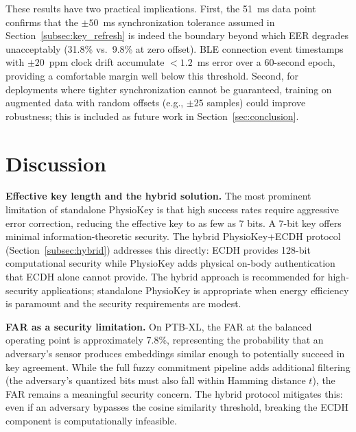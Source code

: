 \documentclass[sensors,article,submit,pdftex,moreauthors]{Definitions/mdpi}
\begin{document}
These results have two practical implications. First, the 51~ms data point confirms that the $\pm 50$~ms synchronization tolerance assumed in Section~\ref{subsec:key_refresh} is indeed the boundary beyond which EER degrades unacceptably (31.8\% vs.\ 9.8\% at zero offset). BLE connection event timestamps with $\pm 20$~ppm clock drift accumulate $< 1.2$~ms error over a 60-second epoch, providing a comfortable margin well below this threshold. Second, for deployments where tighter synchronization cannot be guaranteed, training on augmented data with random offsets (e.g., $\pm 25$ samples) could improve robustness; this is included as future work in Section~\ref{sec:conclusion}.


\section{Discussion}
\label{sec:discussion}

\textbf{Effective key length and the hybrid solution.} The most prominent limitation of standalone PhysioKey is that high success rates require aggressive error correction, reducing the effective key to as few as 7 bits. A 7-bit key offers minimal information-theoretic security. The hybrid PhysioKey+ECDH protocol (Section~\ref{subsec:hybrid}) addresses this directly: ECDH provides 128-bit computational security while PhysioKey adds physical on-body authentication that ECDH alone cannot provide. The hybrid approach is recommended for high-security applications; standalone PhysioKey is appropriate when energy efficiency is paramount and the security requirements are modest.

\textbf{FAR as a security limitation.} On PTB-XL, the FAR at the balanced operating point is approximately 7.8\%, representing the probability that an adversary's sensor produces embeddings similar enough to potentially succeed in key agreement. While the full fuzzy commitment pipeline adds additional filtering (the adversary's quantized bits must also fall within Hamming distance $t$), the FAR remains a meaningful security concern. The hybrid protocol mitigates this: even if an adversary bypasses the cosine similarity threshold, breaking the ECDH component is computationally infeasible.
\end{document}

